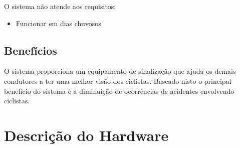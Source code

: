 \documentclass[conference]{IEEEtran}
\begin{document}
O sistema não atende aos requisitos:
\begin{itemize}
  \item Funcionar em dias chuvosos
\end{itemize}

\subsection{Benefícios}
O sistema proporciona um equipamento de sinalização que ajuda os demais condutores
a ter uma melhor visão dos ciclistas. Baseado nisto o principal benefício do sistema
é a diminuição de ocorrências de acidentes envolvendo ciclistas.


\section{Descrição do Hardware}
\end{document}
